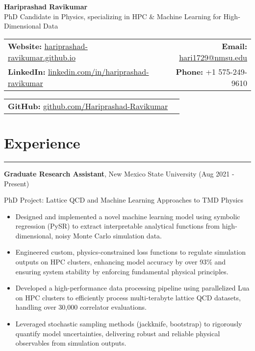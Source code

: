 \documentclass[11pt]{article}
\begin{document}
\begin{center}
  \textbf{\Huge Hariprashad Ravikumar} \\[0.6em]
  \vspace{0.5em}
  PhD Candidate in Physics, specializing in HPC \& Machine Learning for High‐Dimensional Data \\
\end{center}

\begin{tabularx}{\textwidth}{@{}Xr@{}}
    \textbf{Website:} \href{https://hariprashad-ravikumar.github.io}{hariprashad-ravikumar.github.io} & \textbf{Email:} \href{mailto:hari1729@nmsu.edu}{hari1729@nmsu.edu}  \\
    \textbf{LinkedIn:} \href{https://www.linkedin.com/in/hariprashad-ravikumar}{linkedin.com/in/hariprashad-ravikumar} & \textbf{Phone:} +1 575-249-9610 
\end{tabularx}
\vspace{-1em}
\begin{tabularx}{\textwidth}{@{}Xr@{}}
\textbf{GitHub:} \href{https://github.com/Hariprashad-Ravikumar}{github.com/Hariprashad-Ravikumar}  \\
\end{tabularx}


\section*{Experience}
\hrule
\vspace{-0.3em}
\textbf{Graduate Research Assistant}, New Mexico State University \hfill (Aug 2021 - Present)
\vspace{-0.2em}

PhD Project: Lattice QCD and Machine Learning Approaches to TMD Physics
\vspace{-0.5em}
\begin{itemize}
    \item Designed and implemented a novel machine learning model using symbolic regression (PySR) to extract interpretable analytical functions from high-dimensional, noisy Monte Carlo simulation data.
    \vspace{-1.5em}
    \item Engineered custom, physics-constrained loss functions to regulate simulation outputs on HPC clusters, enhancing model accuracy by over 93\% and ensuring system stability by enforcing fundamental physical principles.
    \vspace{-0.5em}
    \item Developed a high-performance data processing pipeline using parallelized Lua on HPC clusters to efficiently process multi-terabyte lattice QCD datasets, handling over 30,000 correlator evaluations.
    \vspace{-0.5em}
    \item Leveraged stochastic sampling methods (jackknife, bootstrap) to rigorously quantify model uncertainties, delivering robust and reliable physical observables from simulation outputs.
\end{itemize}
\end{document}
